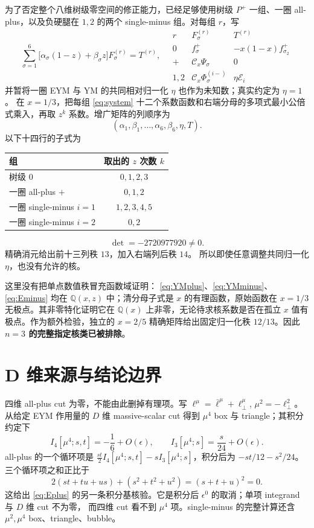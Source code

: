 \documentclass[UTF8,a4paper,11pt]{ctexart}
\newcommand{\Cy}{\mathcal C_x}
\begin{document}
为了否定整个八维树级零空间的修正能力，已经足够使用树级 \(P^+\) 一组、一圈 all-plus，以及负硬腿在 \(1,2\) 的两个 single-minus 组。对每组 \(r\)，写
\begin{equation}
\sum_{\sigma=1}^{6}
\bigl[\alpha_\sigma(1-z)+\beta_\sigma z\bigr]F_\sigma^{(r)}
=T^{(r)},\quad
\begin{array}{c|c|c}
r&F_\sigma^{(r)}&T^{(r)}\\ \hline
0&f_\sigma^+&-x(1-x)f_{\sigma_2}^+\\
+&\Cy\Psi_\sigma&0\\
1,2&\Cy\Phi_\sigma^{(i-)}&\eta\mathcal E_i
\end{array}
\label{eq:system}
\end{equation}
并暂将一圈 EYM 与 YM 的共同相对归一化 \(\eta\) 也作为未知数；真实约定为 \(\eta=1\)。
在 \(x=1/3\)，把每组 \eqref{eq:system} 十二个系数函数和右端分母的多项式最小公倍式乘入，再取 \(z^k\) 系数。增广矩阵的列顺序为
\[
(\alpha_1,\beta_1,\ldots,\alpha_6,\beta_6,\eta,T).
\]
以下十四行的子式为
\begin{center}
\begin{tabular}{lc}
\toprule
组 & 取出的 \(z\) 次数 \(k\)\\
\midrule
树级 \(0\) & \(0,1,2,3\)\\
一圈 all-plus \(+\) & \(0,1,2\)\\
一圈 single-minus \(i=1\) & \(1,2,3,4,5\)\\
一圈 single-minus \(i=2\) & \(0,2\)\\
\bottomrule
\end{tabular}
\end{center}
\begin{equation}
\boxed{\det=-2720977920\ne0.}
\label{eq:cert}
\end{equation}
精确消元给出前十三列秩 \(13\)，加入右端列后秩 \(14\)。
所以即使任意调整共同归一化 \(\eta\)，也没有允许的核。

这里没有把单点数值秩冒充函数域证明：
\eqref{eq:YMplus}、\eqref{eq:YMminus}、\eqref{eq:Eminus} 均在
\(\mathbb Q(x,z)\) 中；清分母子式是 \(x\) 的有理函数，原始函数在 \(x=1/3\) 无极点。其非零特化证明它在 \(\mathbb Q(x)\) 上非零，无论待求核系数是否在孤立 \(x\) 值有极点。作为额外检验，独立的 \(x=2/5\) 精确矩阵给出固定归一化秩 \(12/13\)。因此 \textbf{\(n=3\) 的完整指定核类已被排除}。

\section{D 维来源与结论边界}
四维 all-plus cut 为零，不能由此删掉有理项。写
\(\ell^\mu=\bar\ell^\mu+\ell_\perp^\mu\), \(\mu^2=-\ell_\perp^2\)。
\cite{NPT} 从给定 EYM 作用量的 \(D\) 维 massive-scalar cut 得到
\(\mu^4\) box 与 triangle；其积分约定下
\[
I_4[\mu^4;s,t]=-\frac16+O(\epsilon),\qquad
I_3[\mu^4;s]=\frac{s}{24}+O(\epsilon).
\]
all-plus 的一个循环项是
\(\frac{st}{2}I_4[\mu^4;s,t]-sI_3[\mu^4;s]\)，积分后为
\(-st/12-s^2/24\)。三个循环项之和正比于
\[
2(st+tu+us)+(s^2+t^2+u^2)=(s+t+u)^2=0.
\]
这给出 \eqref{eq:Eplus} 的另一条积分基核验。它是积分后
\(\epsilon^0\) 的取消；单项 integrand 与 \(D\) 维 cut 不为零，
而四维 cut 看不到 \(\mu^4\) 项。single-minus 的完整计算还含
\(\mu^2,\mu^4\) box、triangle、bubble。
\end{document}
